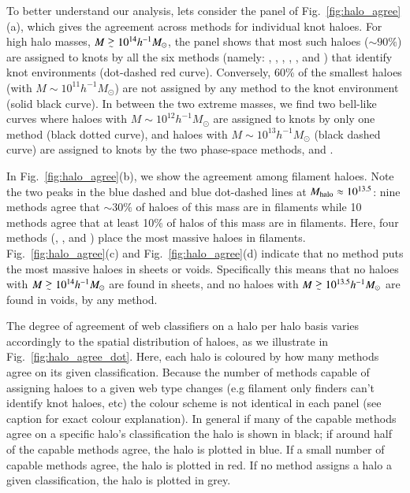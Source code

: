 To better understand our analysis, lets consider the panel of Fig.~\ref{fig:halo_agree}(a), which gives the agreement across methods for individual knot haloes. For high halo masses, $M\gsim10^{14}h^{-1}M_{\odot}$, the panel shows that most such haloes ($\sim90\%$) are assigned to knots by all the six methods (namely: \nexus{}, \tweb{}, \vweb{}, \classic{}, \origami{}, and \mswa{}) that identify knot environments (dot-dashed red curve). Conversely, 60\% of the smallest haloes (with $M\sim10^{11}h^{-1}M_{\odot}$) are not assigned by any method to the knot environment (solid black curve). In between the two extreme masses, we find two bell-like curves where haloes with $M\sim10^{12}h^{-1}M_{\odot}$ are assigned to knots by only one method (black dotted curve), and haloes with $M\sim10^{13}h^{-1}M_{\odot}$ (black dashed curve) are assigned to knots by the two phase-space methods, \mswa{} and \origami{}.

In Fig.~\ref{fig:halo_agree}(b), we show the agreement among filament haloes. Note the two peaks in the blue dashed and blue dot-dashed lines at $M_{\rm halo}\approx 10^{13.5}$: nine methods agree that $\sim30\%$ of haloes of this mass are in filaments while 10 methods agree that at least 10\% of halos of this mass are in filaments. Here, four methods (\disperse{}, \spine{}, \mmft{} and \mst{}) place the most massive haloes in filaments. Fig.~\ref{fig:halo_agree}(c) and Fig.~\ref{fig:halo_agree}(d) indicate that no method puts the most massive haloes in sheets or voids. Specifically this means that no haloes with $M\gsim10^{14}h^{-1}M_{\odot}$ are found in sheets, and no haloes with $M\gsim10^{13.5}h^{-1}M_{\odot}$ are found in voids, by any method. 



The degree of agreement of web classifiers on a halo per halo basis varies accordingly to the spatial distribution of haloes, as we illustrate in Fig.~\ref{fig:halo_agree_dot}. Here, each halo is coloured by how many methods agree on its given classification. Because the number of methods capable of assigning haloes to a given web type changes (e.g filament only finders can't identify knot haloes, etc) the colour scheme is not identical in each panel (see caption for exact colour explanation). In general if many of the capable methods agree on a specific halo's classification the halo is shown in black; if around half of the capable methods agree, the halo is plotted in blue. If a small number of capable methods agree, the halo is plotted in red. If no method assigns a halo a given classification, the halo is plotted in grey.

